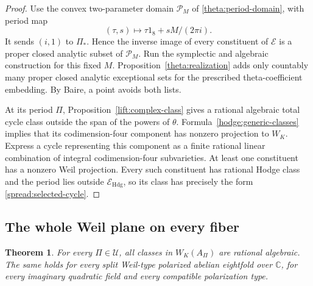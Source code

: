 \documentclass[11pt]{article}
\newtheorem{theorem}{Theorem}[section]
\theoremstyle{definition}
\theoremstyle{remark}
\numberwithin{equation}{section}
\begin{document}
\begin{proof}
Use the convex two-parameter domain $\mathcal P_M$ of
\eqref{theta:period-domain}, with period map
\[
 (\tau,s)\longmapsto\tau1_8+sM/(2\pi i).
\]
It sends $(i,1)$ to $\Pi_*$.  Hence the inverse image of every
constituent of $\mathcal E$ is a proper closed analytic subset of
$\mathcal P_M$.  Run the symplectic and algebraic construction for
this fixed $M$.  Proposition~\ref{theta:realization} adds only countably
many proper closed analytic exceptional sets for the prescribed
theta-coefficient embedding.  By Baire, a point avoids both lists.

At its period $\Pi$, Proposition~\ref{lift:complex-class} gives a
rational algebraic total cycle class outside the span of the powers
of $\theta$.  Formula~\eqref{hodge:generic-classes} implies that its
codimension-four component has nonzero projection to $W_K$.
Express a cycle representing this component as a finite rational
linear combination of integral codimension-four subvarieties.  At least
one constituent has a nonzero Weil projection.  Every such constituent
has rational Hodge class and the period lies outside
$\mathcal E_{\mathrm{Hdg}}$, so its class has precisely the form
\eqref{spread:selected-cycle}.
\end{proof}

\subsection{The whole Weil plane on every fiber}

\begin{theorem}
\label{spread:all-fibers}
For every $\Pi\in\mathcal U$, all classes in $W_K(A_\Pi)$ are
rational algebraic.  The same holds for every split Weil-type
polarized abelian eightfold over $\mathbb C$, for every imaginary quadratic
field and every compatible polarization type.
\end{theorem}
\end{document}
